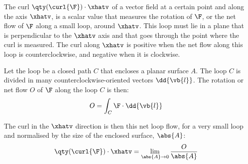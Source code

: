 The curl $\qty(\curl{\F}) \cdot \xhatv$ of a vector field at a certain point
and along the axis $\xhatv$, is a scalar value that measures the rotation of
$\F$, or the net flow of $\F$ along a small loop, around $\xhatv$. This loop
must lie in a plane that is perpendicular to the $\xhatv$ axis and that goes
through the point where the curl is measured. The curl along $\xhatv$ is
positive when the net flow along this loop is counterclockwise, and negative
when it is clockwise.

Let the loop be a closed path $C$ that encloses a planar surface $A$. The
loop $C$ is divided in many counterclockwise-oriented vectors $\dd{\vb{l}}$.
The rotation or net flow $O$ of $\F$ along the loop $C$ is then:
\[
O = \int_C{\F \cdot \dd{\vb{l}}}
\]

The curl in the $\xhatv$ direction is then this net loop flow, for a very
small loop and normalised by the size of the enclosed surface, $\abs{A}$:
\[
\qty(\curl{\F}) \cdot \xhatv = \lim_{\abs{A} \to 0}{\frac{O}{\abs{A}}}
\]










